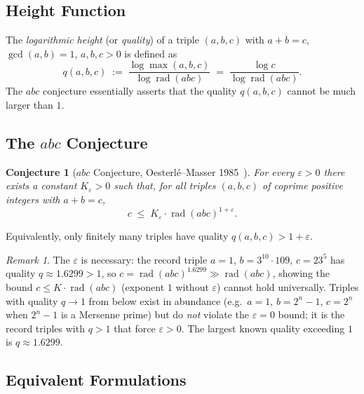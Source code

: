 \documentclass[12pt,a4paper]{article}
\newtheorem{conjecture}[theorem]{Conjecture}
\theoremstyle{remark}
\newtheorem{remark}[theorem]{Remark}
\begin{document}
\subsection{Height Function}

The \emph{logarithmic height} (or \emph{quality}) of a triple $(a,b,c)$ with $a+b=c$,
$\gcd(a,b)=1$, $a,b,c>0$ is defined as
\begin{equation}\label{eq:quality}
  q(a,b,c) \;:=\; \frac{\log\max(a,b,c)}{\log\operatorname{rad}(abc)}
             \;=\; \frac{\log c}{\log\operatorname{rad}(abc)}.
\end{equation}
The $abc$ conjecture essentially asserts that the quality $q(a,b,c)$ cannot be much
larger than $1$.

\subsection{The $abc$ Conjecture}

\begin{conjecture}[$abc$ Conjecture, Oesterlé--Masser 1985~\cite{Oesterle1988,Masser1985}]
  For every $\varepsilon > 0$ there exists a constant $K_\varepsilon > 0$ such that, for
  all triples $(a,b,c)$ of coprime positive integers with $a + b = c$,
  \begin{equation}\label{eq:abc}
    c \;\leq\; K_\varepsilon \cdot \operatorname{rad}(abc)^{1+\varepsilon}.
  \end{equation}
\end{conjecture}

Equivalently, only finitely many triples have quality $q(a,b,c) > 1+\varepsilon$.

\begin{remark}
  The $\varepsilon$ is necessary: the record triple $a=1$, $b=3^{10}\cdot109$,
  $c=23^5$ has quality $q \approx 1.6299 > 1$, so $c = \operatorname{rad}(abc)^{1.6299}
  \gg \operatorname{rad}(abc)$, showing the bound $c \leq K \cdot \operatorname{rad}(abc)$
  (exponent $1$ without $\varepsilon$) cannot hold universally.  Triples with quality
  $q \to 1$ from below exist in abundance (e.g.\ $a=1$, $b=2^n-1$, $c=2^n$ when
  $2^n-1$ is a Mersenne prime) but do \emph{not} violate the $\varepsilon=0$ bound;
  it is the record triples with $q > 1$ that force $\varepsilon > 0$.  The largest
  known quality exceeding $1$ is $q \approx 1.6299$.
\end{remark}

\subsection{Equivalent Formulations}
\end{document}
